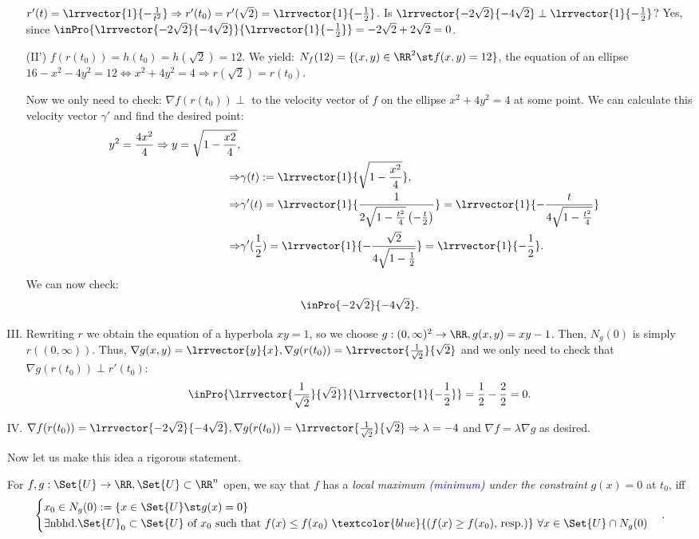 \begin{exam}
\begin{enumerate}[(I)]
  	$r'(t)=\lrrvector{1}{-\frac{1}{t^2}}\Rightarrow r'(t_0)=r'(\sqrt{2})=\lrrvector{1}{-\frac{1}{2}}$. Is $\lrrvector{-2\sqrt{2}}{-4\sqrt{2}}\perp\lrrvector{1}{-\frac{1}{2}}$?
  	Yes, since $\inPro{\lrrvector{-2\sqrt{2}}{-4\sqrt{2}}}{\lrrvector{1}{-\frac{1}{2}}}=-2\sqrt{2}+2\sqrt{2}=0$.
  	\item[(II')] $f(r(t_0))=h(t_0)=h(\sqrt{2})=12$. We yield: $N_f(12)=\{(x,y)\in\RR^2\st f(x,y)=12\}$, the equation of an ellipse $16-x^2-4y^2=12\Leftrightarrow x^2+4y^2=4\Rightarrow r(\sqrt{2})=r(t_0)$.\par 
  	Now we only need to check: $\nabla f(r(t_0))\perp$ to the velocity vector of $f$ on the ellipse $x^2+4y^2=4$ at some point. We can calculate this velocity vector $\gamma'$ and find the desired point: 
  	\begin{align*}
  	  y^2=\frac{4x^2}{4}\Rightarrow y=\sqrt{1-\frac{x2}{4}}, \\\Rightarrow&\gamma(t):=\lrrvector{1}{\sqrt{1-\frac{x^2}{4}}},\\ \Rightarrow&\gamma'(t)=\lrrvector{1}{\frac{1}{2\sqrt{1-\frac{t^2}{4}}\left(-\frac{t}{2}\right)}}=\lrrvector{1}{-\frac{t}{4\sqrt{1-\frac{t^2}{4}}}}\\\Rightarrow& \gamma'(\frac{1}{2})=\lrrvector{1}{-\frac{\sqrt{2}}{4\sqrt{1-\frac{1}{2}}}}=\lrrvector{1}{-\frac{1}{2}}.
  	\end{align*}
  	We can now check:
  	$$\inPro{-2\sqrt{2}}{-4\sqrt{2}}.$$
  	\item Rewriting $r$ we obtain the equation of a hyperbola $xy=1$, so we choose $g:(0,\infty)^2\to\RR, g(x,y)=xy-1$. Then, $N_g(0)$ is simply $r((0,\infty))$. Thus, $\nabla g(x,y)=\lrrvector{y}{x}, \nabla g(r(t_0))=\lrrvector{\frac{1}{\sqrt{2}}}{\sqrt{2}}$ and we only need to check that $\nabla g(r(t_0))\perp r'(t_0)$:
  	$$\inPro{\lrrvector{\frac{1}{\sqrt{2}}}{\sqrt{2}}}{\lrrvector{1}{-\frac{1}{2}}}=\frac{1}{2}-\frac{2}{2}=0.$$
  	\item $\nabla f(r(t_0))=\lrrvector{-2\sqrt{2}}{-4\sqrt{2}}, \nabla g(r(t_0))=\lrrvector{\frac{1}{\sqrt{2}}}{\sqrt{2}}\Rightarrow \lambda=-4$ and $\nabla f=\lambda \nabla g$ as desired. 
  \end{enumerate}
\end{exam}
Now let us make this idea a rigorous statement. 
\begin{defn}
  For $f, g:\Set{U}\to\RR, \Set{U}\subset\RR^n$ open, we say that $f$ has a \emph{local maximum \textcolor{blue}{(minimum)} under the constraint} $g(x)=0$ at $t_0$, iff $$\begin{cases}x_0\in N_g(0):=\{x\in\Set{U}\st g(x)=0\}\\
  \exists\mathrm{ nbhd. }\Set{U}_0\subset\Set{U}\text{ of }x_0\text{ such that }f(x)\leq f(x_0)\ \textcolor{blue}{\left(f(x)\geq f(x_0)\text{, resp.}\right)}\ \forall x\in\Set{U}\cap N_g(0)\end{cases}.$$
\end{defn}
